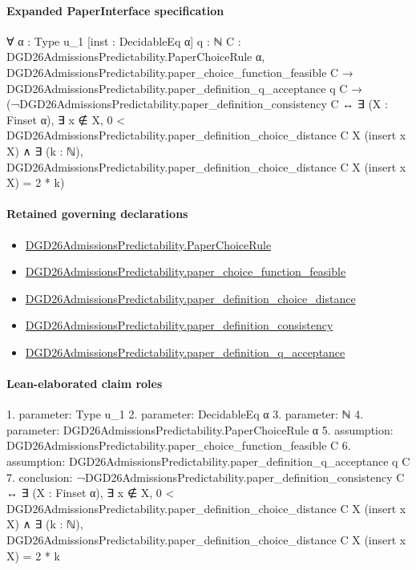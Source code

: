 \documentclass[10pt]{article}
\begin{document}
\paragraph{Expanded PaperInterface specification}
\begin{ReviewVerbatim}
∀ {α : Type u_1} [inst : DecidableEq α] {q : ℕ} {C : DGD26AdmissionsPredictability.PaperChoiceRule α},
  DGD26AdmissionsPredictability.paper_choice_function_feasible C →
    DGD26AdmissionsPredictability.paper_definition_q_acceptance q C →
      (¬DGD26AdmissionsPredictability.paper_definition_consistency C ↔
        ∃ (X : Finset α),
          ∃ x ∉ X,
            0 < DGD26AdmissionsPredictability.paper_definition_choice_distance C X (insert x X) ∧
              ∃ (k : ℕ), DGD26AdmissionsPredictability.paper_definition_choice_distance C X (insert x X) = 2 * k)
\end{ReviewVerbatim}

\paragraph{Retained governing declarations}
\begin{itemize}\raggedright
\item \hyperlink{governing-declaration-4678951b4432b184}{DGD26\allowbreak{}Admissions\allowbreak{}Predictability.\allowbreak{}Paper\allowbreak{}Choice\allowbreak{}Rule}
\item \hyperlink{governing-declaration-f7de74a44053f6d5}{DGD26\allowbreak{}Admissions\allowbreak{}Predictability.\allowbreak{}paper\_\allowbreak{}choice\_\allowbreak{}function\_\allowbreak{}feasible}
\item \hyperlink{governing-declaration-64f97a980e20e425}{DGD26\allowbreak{}Admissions\allowbreak{}Predictability.\allowbreak{}paper\_\allowbreak{}definition\_\allowbreak{}choice\_\allowbreak{}distance}
\item \hyperlink{governing-declaration-2c6907b2b3cc5a08}{DGD26\allowbreak{}Admissions\allowbreak{}Predictability.\allowbreak{}paper\_\allowbreak{}definition\_\allowbreak{}consistency}
\item \hyperlink{governing-declaration-7ecd62274fb2f391}{DGD26\allowbreak{}Admissions\allowbreak{}Predictability.\allowbreak{}paper\_\allowbreak{}definition\_\allowbreak{}q\_\allowbreak{}acceptance}
\end{itemize}
\paragraph{Lean-elaborated claim roles}\begin{ReviewVerbatim}
1. parameter: Type u_1
2. parameter: DecidableEq α
3. parameter: ℕ
4. parameter: DGD26AdmissionsPredictability.PaperChoiceRule α
5. assumption: DGD26AdmissionsPredictability.paper_choice_function_feasible C
6. assumption: DGD26AdmissionsPredictability.paper_definition_q_acceptance q C
7. conclusion: ¬DGD26AdmissionsPredictability.paper_definition_consistency C ↔
  ∃ (X : Finset α),
    ∃ x ∉ X,
      0 < DGD26AdmissionsPredictability.paper_definition_choice_distance C X (insert x X) ∧
        ∃ (k : ℕ), DGD26AdmissionsPredictability.paper_definition_choice_distance C X (insert x X) = 2 * k
\end{ReviewVerbatim}
\end{document}
